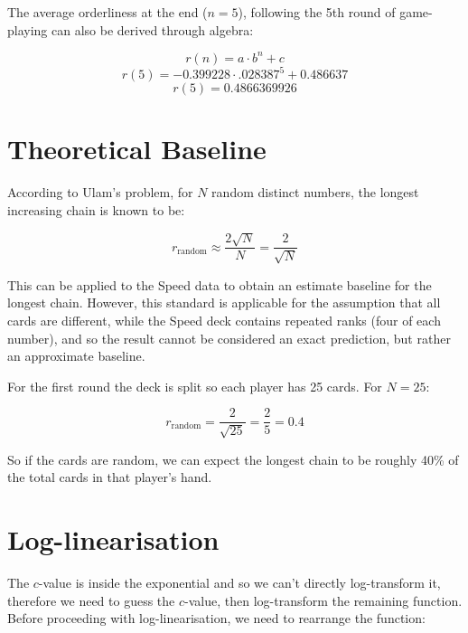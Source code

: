 The average orderliness at the end ($n=5$), following the 5th round of game-playing can also be derived through algebra:

\begin{equation}
r(n)={a\cdot{b}^{n}+c} 
\end{equation}
\begin{equation}
r(5)={-0.399228\cdot{.028387}^{5}+0.486637}
\end{equation}
\begin{equation}
r(5)=0.4866369926   
\label{endOrder}	
\end{equation}

\section{Theoretical Baseline}

According to Ulam's problem, for $N$ random distinct numbers, the longest increasing chain is known to be:

\begin{equation}
r_\text{random}≈\frac{2\sqrt{N}}{N}=\frac{2}{\sqrt{N}} 
\end{equation}

This can be applied to the Speed data to obtain an estimate baseline for the longest chain. However, this standard is applicable for the assumption that all cards are different, while the Speed deck contains repeated ranks (four of each number), and so the result cannot be considered an exact prediction, but rather an approximate baseline.

For the first round the deck is split so each player has 25 cards. For $N=25$:
 
\begin{equation}
r_\text{random}=\frac{2}{\sqrt{25}}
=\frac{2}{5}
=0.4
\end{equation}

So if the cards are random, we can expect the longest chain to be roughly 40\% of the total cards in that player's hand.



\section{Log-linearisation}

The $c$-value is inside the exponential and so we can't directly log-transform it, therefore we need to guess the $c$-value, then log-transform the remaining function. Before proceeding with log-linearisation, we need to rearrange the function:

